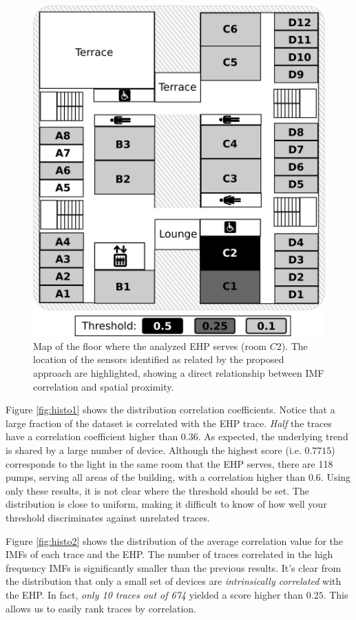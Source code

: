 \begin{figure}
\centering
\includegraphics[width=.45\textwidth]{img/floorMap.png}
\caption{Map of the floor where the analyzed EHP serves (room $C2$). The location of the sensors identified as related by the proposed approach are highlighted, showing a direct relationship between IMF correlation and spatial proximity.}
\label{fig:map}
\end{figure}

Figure \ref{fig:histo1} shows the distribution correlation coefficients.  Notice
that a large fraction of the dataset is correlated with the EHP trace.
\emph{Half} the traces have a correlation coefficient higher than $0.36$.  As expected, the underlying
trend is shared by a large number of device.
Although the highest score (i.e. $0.7715$) corresponds to the light in the same room that the EHP serves,
there are 118 pumps, serving all areas of the building, with a correlation higher than $0.6$.
Using only these results, it is not clear where the threshold should be set.  The distribution is close to 
uniform, making it difficult to 
know of how well your threshold discriminates against unrelated traces.

Figure \ref{fig:histo2} shows the distribution of the average correlation value for the IMFs of
each trace and the EHP.  The number of traces correlated in the high frequency IMFs is significantly smaller
than the previous results. It's clear from the distribution that only a small set of devices are
\emph{intrinsically correlated} with the EHP.  In fact, \emph{only 10 traces out of 674} yielded a score higher than 
$0.25$. This allows us to easily rank traces by correlation.

